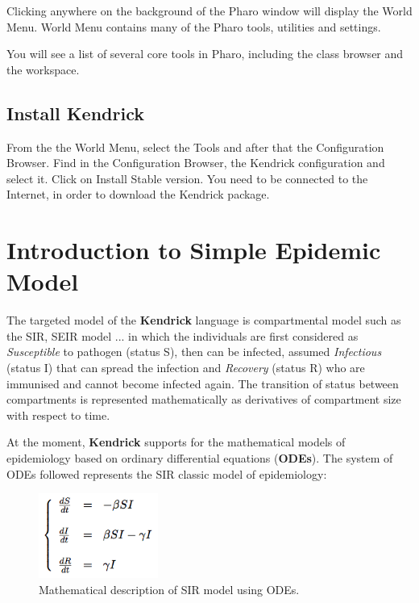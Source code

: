 \documentclass[a4paper,10pt,twoside]{book}
\begin{document}
Clicking anywhere on the background of the Pharo window will display the
World Menu. World Menu contains many of the Pharo tools, utilities and settings.

You will see a list of several core tools in Pharo, including the class browser
and the workspace.
\section{Install Kendrick}
From the the World Menu, select the Tools and after that the Configuration Browser.
Find in the Configuration Browser, the Kendrick configuration and select it. Click on Install Stable version.
You need to be connected to the Internet, in order to download the Kendrick package.
\chapter{ Introduction to Simple Epidemic Model}
The targeted model of the \textbf{Kendrick} language is compartmental model such as the SIR, SEIR model ... in which the individuals are first considered as \textit{Susceptible} to pathogen (status S), then can be infected, assumed \textit{Infectious} (status I) that can spread the infection and \textit{Recovery} (status R) who are immunised and cannot become infected again. The transition of status between compartments is represented mathematically as derivatives of compartment size with respect to time.

At the moment, \textbf{Kendrick} supports for the mathematical models of epidemiology based on ordinary differential equations (\textbf{ODEs}). The system of ODEs followed represents the SIR classic model of epidemiology:


\begin{figure}

\begin{center}
\includegraphics[width=0.35\textwidth]{figures/equation1.png}\caption{Mathematical description of SIR model using ODEs.\label{equation1}}\end{center}
\end{figure}
\end{document}
